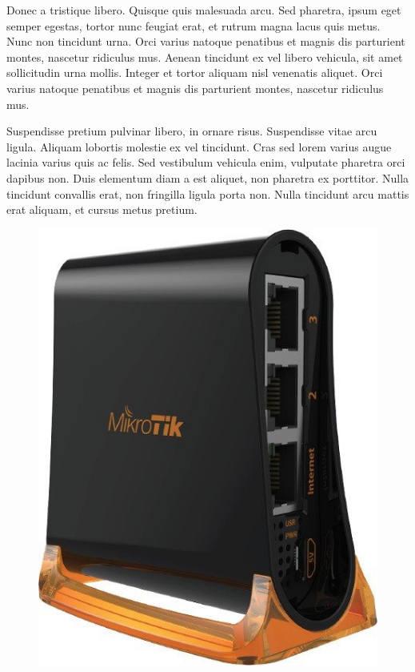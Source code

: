 \documentclass{skripta}
\begin{document}
Donec a tristique libero. Quisque quis malesuada arcu. Sed pharetra, ipsum eget semper egestas, tortor nunc feugiat erat, et rutrum magna lacus quis metus. Nunc non tincidunt urna. Orci varius natoque penatibus et magnis dis parturient montes, nascetur ridiculus mus. Aenean tincidunt ex vel libero vehicula, sit amet sollicitudin urna mollis. Integer et tortor aliquam nisl venenatis aliquet. Orci varius natoque penatibus et magnis dis parturient montes, nascetur ridiculus mus.

Suspendisse pretium pulvinar libero, in ornare risus. Suspendisse vitae arcu ligula. Aliquam lobortis molestie ex vel tincidunt. Cras sed lorem varius augue lacinia varius quis ac felis. Sed vestibulum vehicula enim, vulputate pharetra orci dapibus non. Duis elementum diam a est aliquet, non pharetra ex porttitor. Nulla tincidunt convallis erat, non fringilla ligula porta non. Nulla tincidunt arcu mattis erat aliquam, et cursus metus pretium.

\begin{figure}[ht]
\centering
\includegraphics[scale=0.4]{images/mikrotik-routerboard.jpg}
\end{figure}
\end{document}
